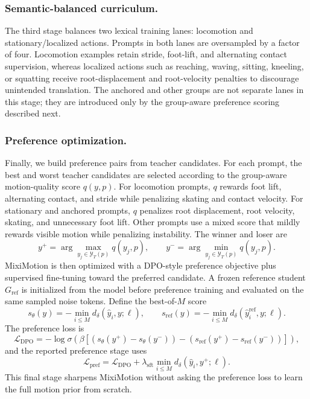 \documentclass[runningheads]{llncs}
\begin{document}
\subsubsection{Semantic-balanced curriculum.}
The third stage balances two lexical training lanes: locomotion and
stationary/localized actions. Prompts in both lanes are oversampled by a
factor of four. Locomotion examples retain stride, foot-lift, and alternating
contact supervision, whereas localized actions such as reaching, waving,
sitting, kneeling, or squatting receive root-displacement and root-velocity
penalties to discourage unintended translation. The anchored and other groups
are not separate lanes in this stage; they are introduced only by the
group-aware preference scoring described next.

\subsubsection{Preference optimization.}
Finally, we build preference pairs from teacher candidates. For each prompt,
the best and worst teacher candidates are selected according to the
group-aware motion-quality score $q(y,p)$. For locomotion prompts, $q$ rewards
foot lift, alternating contact, and stride while penalizing skating and contact
velocity. For stationary and anchored prompts, $q$ penalizes root displacement,
root velocity, skating, and unnecessary foot lift. Other prompts use a mixed
score that mildly rewards visible motion while penalizing instability. The
winner and loser are
\begin{equation}
  y^+ = \arg\max_{y_j \in \mathcal{Y}_T(p)} q(y_j,p),
  \qquad
  y^- = \arg\min_{y_j \in \mathcal{Y}_T(p)} q(y_j,p).
\end{equation}
MixiMotion is then optimized with a DPO-style preference objective plus
supervised fine-tuning toward the preferred candidate. A frozen reference
student $G_{\mathrm{ref}}$ is initialized from the model before preference
training and evaluated on the same sampled noise tokens. Define the best-of-$M$
score
\begin{equation}
  s_\theta(y) = -\min_{i \le M} d_\delta(\hat{y}_i,y;\ell),
  \qquad
  s_{\mathrm{ref}}(y) = -\min_{i \le M}
  d_\delta(\hat{y}^{\mathrm{ref}}_i,y;\ell).
\end{equation}
The preference loss is
\begin{equation}
  \mathcal{L}_{\mathrm{DPO}}
  = -\log \sigma\left(
    \beta\left[
    (s_\theta(y^+) - s_\theta(y^-))
    - (s_{\mathrm{ref}}(y^+) - s_{\mathrm{ref}}(y^-))
    \right]\right),
\end{equation}
and the reported preference stage uses
\begin{equation}
  \mathcal{L}_{\mathrm{pref}}
  = \mathcal{L}_{\mathrm{DPO}}
  + \lambda_{\mathrm{sft}}\min_{i \le M}d_\delta(\hat{y}_i,y^+;\ell).
\end{equation}
This final stage sharpens MixiMotion without asking the preference loss to
learn the full motion prior from scratch.
\end{document}
